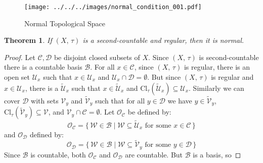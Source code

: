 \documentclass{article}
\theoremstyle{plain}
\newtheorem{theorem}{Theorem}[section]
\theoremstyle{normal}
\begin{document}
        \begin{figure}
            \centering
            \texttt{[image: ../../../images/normal\_condition\_001.pdf]}
            \caption{Normal Topological Space}
            \label{fig:normal_condition_001}
        \end{figure}
        \begin{theorem}
            If $(X,\,\tau)$ is a second-countable and regular, then it is
            normal.
        \end{theorem}
        \begin{proof}
            Let $\mathcal{C},\mathcal{D}$ be disjoint closed subsets of $X$.
            Since $(X,\,\tau)$ is second-countable there is a countable basis
            $\mathcal{B}$. For all $x\in\mathcal{C}$, since $(X,\,\tau)$ is
            regular, there is an open set $\mathcal{U}_{x}$ such that
            $x\in\mathcal{U}_{x}$ and
            $\mathcal{U}_{x}\cap\mathcal{D}=\emptyset$. But since
            $(X,\,\tau)$ is regular and $x\in\mathcal{U}_{x}$, there is a
            $\tilde{\mathcal{U}}_{x}$ such that $x\in\tilde{\mathcal{U}}_{x}$
            and $\textrm{Cl}_{\tau}(\tilde{\mathcal{U}}_{x})\subseteq\mathcal{U}_{x}$.
            Similarly we can cover $\mathcal{D}$ with sets
            $\mathcal{V}_{y}$ and $\tilde{\mathcal{V}}_{y}$ such that for all
            $y\in\mathcal{D}$ we have
            $y\in\tilde{\mathcal{V}}_{y}$,
            $\textrm{Cl}_{\tau}(\tilde{\mathcal{V}}_{y})\subseteq\mathcal{V}$,
            and $\mathcal{V}_{y}\cap\mathcal{C}=\emptyset$. Let
            $\mathcal{O}_{\mathcal{C}}$ be
            defined by:
            \begin{equation}
                \mathcal{O}_{\mathcal{C}}
                =\{\,\mathcal{W}\in\mathcal{B}\;|\;
                    \mathcal{W}\subseteq\tilde{\mathcal{U}}_{x}
                    \textrm{ for some }x\in\mathcal{C}\,\}
            \end{equation}
            and $\mathcal{O}_{\mathcal{D}}$ defined by:
            \begin{equation}
                \mathcal{O}_{\mathcal{D}}
                =\{\,\mathcal{W}\in\mathcal{B}\;|\;
                    \mathcal{W}\subseteq\tilde{\mathcal{V}}_{y}
                    \textrm{ for some }y\in\mathcal{D}\,\}
            \end{equation}
            Since $\mathcal{B}$ is countable, both
            $\mathcal{O}_{\mathcal{C}}$ and $\mathcal{O}_{\mathcal{D}}$ are
            countable. But $\mathcal{B}$ is a basis, so

\end{proof}
\end{document}
